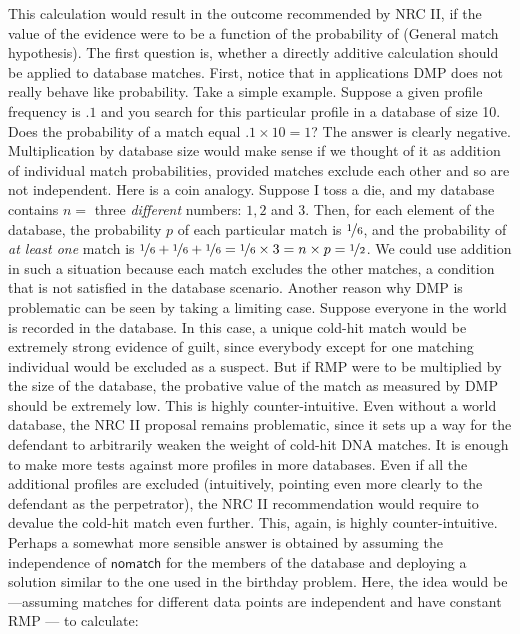 \documentclass[10pt,dvipsnames,enabledeprecatedfontcommands]{scrartcl}
\begin{document}
This calculation would result in the outcome recommended by NRC II, if
the value of the evidence were to be a function of the probability of
(General match hypothesis). The first question is, whether a directly
additive calculation should be applied to database matches. First,
notice that in applications DMP does not really behave like probability.
Take a simple example. Suppose a given profile frequency is \(.1\) and
you search for this particular profile in a database of size 10. Does
the probability of a match equal \(.1 \times 10=1\)? The answer is
clearly negative. Multiplication by database size would make sense if we
thought of it as addition of individual match probabilities, provided
matches exclude each other and so are not independent. Here is a coin
analogy. Suppose I toss a die, and my database contains \(n=\) three
\emph{different} numbers: \(1, 2\) and \(3\). Then, for each element of
the database, the probability \(p\) of each particular match is
\(\nicefrac{1}{6}\), and the probability of \emph{at least one} match is
\(\nicefrac{1}{6}+\nicefrac{1}{6}+\nicefrac{1}{6}=\nicefrac{1}{6}\times 3 = n\times p =\nicefrac{1}{2}\).
We could use addition in such a situation because each match excludes
the other matches, a condition that is not satisfied in the database
scenario. Another reason why DMP is problematic can be seen by taking a
limiting case. Suppose everyone in the world is recorded in the
database. In this case, a unique cold-hit match would be extremely
strong evidence of guilt, since everybody except for one matching
individual would be excluded as a suspect. But if RMP were to be
multiplied by the size of the database, the probative value of the match
as measured by DMP should be extremely low. This is highly
counter-intuitive. Even without a world database, the NRC II proposal
remains problematic, since it sets up a way for the defendant to
arbitrarily weaken the weight of cold-hit DNA matches. It is enough to
make more tests against more profiles in more databases. Even if all the
additional profiles are excluded (intuitively, pointing even more
clearly to the defendant as the perpetrator), the NRC II recommendation
would require to devalue the cold-hit match even further. This, again,
is highly counter-intuitive. Perhaps a somewhat more sensible answer is
obtained by assuming the independence of \(\mathsf{no match}\) for the
members of the database and deploying a solution similar to the one used
in the birthday problem. Here, the idea would be---assuming matches for
different data points are independent and have constant RMP --- to
calculate:
\end{document}
